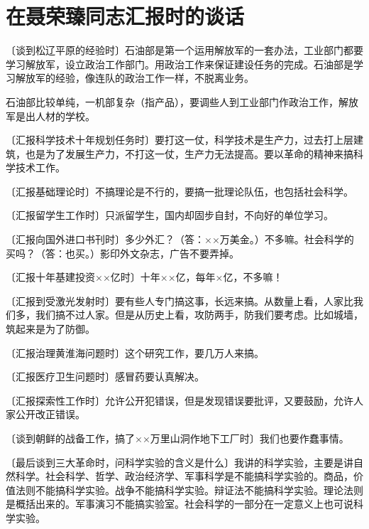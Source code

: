 \section[在聂荣臻同志汇报时的谈话（一九六三年十二月）]{在聂荣臻同志汇报时的谈话}


〔谈到松辽平原的经验时〕石油部是第一个运用解放军的一套办法，工业部门都要学习解放军，设立政治工作部门。用政治工作来保证建设任务的完成。石油部是学习解放军的经验，像连队的政治工作一样，不脱离业务。

石油部比较单纯，一机部复杂（指产品），要调些人到工业部门作政治工作，解放军是出人材的学校。

〔汇报科学技术十年规划任务时〕要打这一仗，科学技术是生产力，过去打上层建筑，也是为了发展生产力，不打这一仗，生产力无法提高。要以革命的精神来搞科学技术工作。

〔汇报基础理论时〕不搞理论是不行的，要搞一批理论队伍，也包括社会科学。

〔汇报留学生工作时〕只派留学生，国内却固步自封，不向好的单位学习。

〔汇报向国外进口书刊时〕多少外汇？（答：××万美金。）不多嘛。社会科学的买吗？（答：也买。）影印外文杂志，广告不要弄掉。

〔汇报十年基建投资××亿时〕十年××亿，每年×亿，不多嘛！

〔汇报到受激光发射时〕要有些人专门搞这事，长远来搞。从数量上看，人家比我们多，我们搞不过人家。但是从历史上看，攻防两手，防我们要考虑。比如城墙，筑起来是为了防御。

〔汇报治理黄淮海问题时〕这个研究工作，要几万人来搞。

〔汇报医疗卫生问题时〕感冒药要认真解决。

〔汇报探索性工作时〕允许公开犯错误，但是发现错误要批评，又要鼓励，允许人家公开改正错误。

〔谈到朝鲜的战备工作，搞了××万里山洞作地下工厂时〕我们也要作蠢事情。

〔最后谈到三大革命时，问科学实验的含义是什么〕我讲的科学实验，主要是讲自然科学。社会科学、哲学、政治经济学、军事科学是不能搞科学实验的。商品，价值法则不能搞科学实验。战争不能搞科学实验。辩证法不能搞科学实验。理论法则是概括出来的。军事演习不能搞实验室。社会科学的一部分在一定意义上也可说科学实验。
